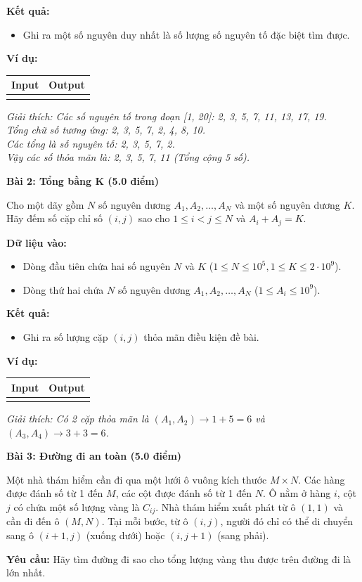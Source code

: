 \documentclass[11pt, a4paper]{article}
\newcommand{\bai}[2]{\vspace{0.5cm}\noindent\textbf{\large Bài #1: #2}}
\newcommand{\iobox}[2]{
    \begin{center}
    \begin{tabularx}{0.9\textwidth}{|X|X|}
    \hline
    \textbf{Input} & \textbf{Output} \\
    \hline
    \vtop{#1} & \vtop{#2} \\
    \hline
    \end{tabularx}
    \end{center}
}
\begin{document}
\textbf{Kết quả:}
\begin{itemize}
    \item Ghi ra một số nguyên duy nhất là số lượng số nguyên tố đặc biệt tìm được.
\end{itemize}

\textbf{Ví dụ:}
\iobox{
1 20
}{
5
}
\textit{Giải thích: Các số nguyên tố trong đoạn [1, 20]: 2, 3, 5, 7, 11, 13, 17, 19. \\
Tổng chữ số tương ứng: 2, 3, 5, 7, 2, 4, 8, 10. \\
Các tổng là số nguyên tố: 2, 3, 5, 7, 2. \\
Vậy các số thỏa mãn là: 2, 3, 5, 7, 11 (Tổng cộng 5 số).}

\bai{2}{Tổng bằng K (5.0 điểm)}

Cho một dãy gồm $N$ số nguyên dương $A_1, A_2, \dots, A_N$ và một số nguyên dương $K$. Hãy đếm số cặp chỉ số $(i, j)$ sao cho $1 \le i < j \le N$ và $A_i + A_j = K$.

\textbf{Dữ liệu vào:}
\begin{itemize}
    \item Dòng đầu tiên chứa hai số nguyên $N$ và $K$ ($1 \le N \le 10^5, 1 \le K \le 2 \cdot 10^9$).
    \item Dòng thứ hai chứa $N$ số nguyên dương $A_1, A_2, \dots, A_N$ ($1 \le A_i \le 10^9$).
\end{itemize}

\textbf{Kết quả:}
\begin{itemize}
    \item Ghi ra số lượng cặp $(i, j)$ thỏa mãn điều kiện đề bài.
\end{itemize}

\textbf{Ví dụ:}
\iobox{
5 6 \newline
1 5 3 3 5
}{
2
}
\textit{Giải thích: Có 2 cặp thỏa mãn là $(A_1, A_2) \to 1+5=6$ và $(A_3, A_4) \to 3+3=6$.}

\vspace{0.5cm} 
\bai{3}{Đường đi an toàn (5.0 điểm)}

Một nhà thám hiểm cần đi qua một lưới ô vuông kích thước $M \times N$. Các hàng được đánh số từ 1 đến $M$, các cột được đánh số từ 1 đến $N$. Ô nằm ở hàng $i$, cột $j$ có chứa một số lượng vàng là $C_{ij}$. Nhà thám hiểm xuất phát từ ô $(1, 1)$ và cần đi đến ô $(M, N)$. Tại mỗi bước, từ ô $(i, j)$, người đó chỉ có thể di chuyển sang ô $(i+1, j)$ (xuống dưới) hoặc $(i, j+1)$ (sang phải).

\textbf{Yêu cầu:} Hãy tìm đường đi sao cho tổng lượng vàng thu được trên đường đi là lớn nhất.
\end{document}
